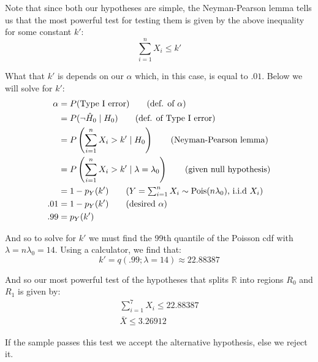 \documentclass{article}
\begin{document}
Note that since both our hypotheses are simple, the Neyman-Pearson lemma tells us that the most powerful test for testing them is given by the above inequality for some constant $k'$:
$$\sum_{i=1}^nX_i\le k'$$

What that $k'$ is depends on our $\alpha$ which, in this case, is equal to $.01$. Below we will solve for $k'$:
\begin{align*}
    \alpha&=P(\text{Type I error})\tag{def. of $\alpha$}\\
    &=P(\neg\hat H_0\mid H_0)\tag{def. of Type I error}\\
    &=P\left(\sum_{i=1}^nX_i>k'\mid H_0\right)\tag{Neyman-Pearson lemma}\\
    &=P\left(\sum_{i=1}^nX_i>k'\mid \lambda=\lambda_0\right)\tag{given null hypothesis}\\
    &=1-p_Y(k')\tag{$Y=\sum_{i=1}^nX_i\sim\text{Pois}(n\lambda_0)$, i.i.d $X_i$}\\
    .01&=1-p_Y(k')\tag{desired $\alpha$}\\
    .99&=p_Y(k')
\end{align*}

And so to solve for $k'$ we must find the 99th quantile of the Poisson cdf with $\lambda=n\lambda_0=14$. Using a calculator, we find that:
$$k'=q(.99;\lambda=14)\approx22.88387$$

And so our most powerful test of the hypotheses that splits $\mathbb R$ into regions $R_0$ and $R_1$ is given by:
\begin{align*}
    \sum_{i=1}^7X_i\le 22.88387\\
    \bar X\le3.26912\tag{divide both sides by $n=7$}
\end{align*}

If the sample passes this test we accept the alternative hypothesis, else we reject it.
\end{document}

